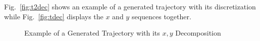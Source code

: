 \documentclass[letterpaper, 10 pt, conference]{ieeeconf}  %
\begin{document}
Fig.~\ref{fig:t2dec} shows an example of a generated trajectory with its discretization while Fig.~\ref{fig:tdec} displays the $x$ and $y$ sequences together.
\begin{figure}[ht]
	\centering
	\caption{Example of a Generated Trajectory with its $x,y$ Decomposition}
	\label{fig:trajdec}
\end{figure}
\end{document}
